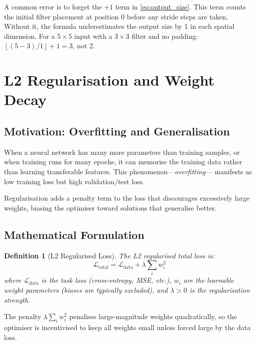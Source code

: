 \documentclass[12pt,a4paper]{article}
\newtheorem{definition}{Definition}[section]
\newcommand{\Ltotal}{\mathcal{L}_{\mathrm{total}}}
\newcommand{\Ldata}{\mathcal{L}_{\mathrm{data}}}
\newcommand{\floor}[1]{\left\lfloor #1 \right\rfloor}
\begin{document}
\begin{warningbox}
A common error is to forget the $+1$ term in \cref{eq:output_size}. This
term counts the initial filter placement at position 0 before any stride
steps are taken. Without it, the formula underestimates the output size by 1
in each spatial dimension. For a $5 \times 5$ input with a $3 \times 3$
filter and no padding: $\floor{(5-3)/1}+1 = 3$, not 2.
\end{warningbox}

\section{L2 Regularisation and Weight Decay}
\label{sec:l2reg}

\subsection{Motivation: Overfitting and Generalisation}

When a neural network has many more parameters than training samples, or
when training runs for many epochs, it can memorise the training data rather
than learning transferable features. This phenomenon---\emph{overfitting}---
manifests as low training loss but high validation/test loss.

Regularisation adds a penalty term to the loss that discourages excessively
large weights, biasing the optimiser toward solutions that generalise better.

\subsection{Mathematical Formulation}

\begin{definition}[L2 Regularised Loss]
\label{def:l2_loss}
The L2 regularised total loss is:
\begin{equation}
  \label{eq:l2_loss}
  \Ltotal = \Ldata + \lambda \sum_{i} w_i^2
\end{equation}
where $\Ldata$ is the task loss (cross-entropy, MSE, etc.),
$w_i$ are the learnable weight parameters (biases are typically excluded),
and $\lambda > 0$ is the regularisation strength.
\end{definition}

The penalty $\lambda \sum_i w_i^2$ penalises large-magnitude weights
quadratically, so the optimiser is incentivised to keep all weights small
unless forced large by the data loss.
\end{document}
